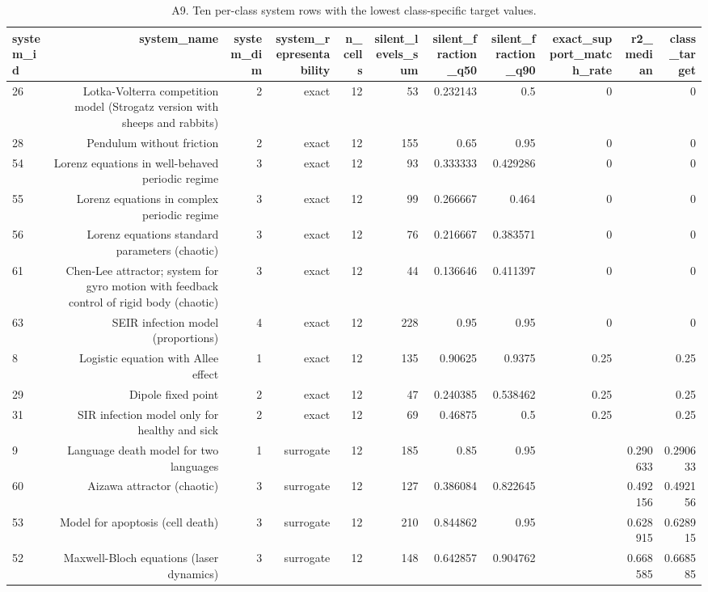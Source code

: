 \begin{table}[htbp]
\centering
\caption{A9. Ten per-class system rows with the lowest class-specific target values.}
\begin{tabular}{lrrrrrrrrrr}
\toprule
system\_id & system\_name & system\_dim & system\_representability & n\_cells & silent\_levels\_sum & silent\_fraction\_q50 & silent\_fraction\_q90 & exact\_support\_match\_rate & r2\_median & class\_target \\
\midrule
26 & Lotka-Volterra competition model (Strogatz version with sheeps and rabbits) & 2 & exact & 12 & 53 & 0.232143 & 0.5 & 0 &  & 0 \\
28 & Pendulum without friction & 2 & exact & 12 & 155 & 0.65 & 0.95 & 0 &  & 0 \\
54 & Lorenz equations in well-behaved periodic regime & 3 & exact & 12 & 93 & 0.333333 & 0.429286 & 0 &  & 0 \\
55 & Lorenz equations in complex periodic regime & 3 & exact & 12 & 99 & 0.266667 & 0.464 & 0 &  & 0 \\
56 & Lorenz equations standard parameters (chaotic) & 3 & exact & 12 & 76 & 0.216667 & 0.383571 & 0 &  & 0 \\
61 & Chen-Lee attractor; system for gyro motion with feedback control of rigid body (chaotic) & 3 & exact & 12 & 44 & 0.136646 & 0.411397 & 0 &  & 0 \\
63 & SEIR infection model (proportions) & 4 & exact & 12 & 228 & 0.95 & 0.95 & 0 &  & 0 \\
8 & Logistic equation with Allee effect & 1 & exact & 12 & 135 & 0.90625 & 0.9375 & 0.25 &  & 0.25 \\
29 & Dipole fixed point & 2 & exact & 12 & 47 & 0.240385 & 0.538462 & 0.25 &  & 0.25 \\
31 & SIR infection model only for healthy and sick & 2 & exact & 12 & 69 & 0.46875 & 0.5 & 0.25 &  & 0.25 \\
9 & Language death model for two languages & 1 & surrogate & 12 & 185 & 0.85 & 0.95 &  & 0.290633 & 0.290633 \\
60 & Aizawa attractor (chaotic) & 3 & surrogate & 12 & 127 & 0.386084 & 0.822645 &  & 0.492156 & 0.492156 \\
53 & Model for apoptosis (cell death) & 3 & surrogate & 12 & 210 & 0.844862 & 0.95 &  & 0.628915 & 0.628915 \\
52 & Maxwell-Bloch equations (laser dynamics) & 3 & surrogate & 12 & 148 & 0.642857 & 0.904762 &  & 0.668585 & 0.668585 \\

\end{tabular}
\end{table}
